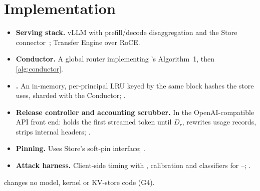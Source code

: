 \section{Implementation}
\label{sec:impl}

\begin{itemize}
\item \textbf{Serving stack.} vLLM  with prefill/decode
  disaggregation and the \mc Store connector~\cite{mooncakerepo}; \mc
  Transfer Engine over RoCE.
\item \textbf{Conductor.} A global router implementing \mc's Algorithm~1, then
  \cref{alg:conductor}. 
\item \textbf{\vcd.} An in-memory, per-principal LRU keyed by the same block
  hashes the store uses, sharded with the Conductor; .
\item \textbf{Release controller and accounting scrubber.} In the
  OpenAI-compatible API front end: holds the first streamed token until $D_r$,
  rewrites usage records, strips internal headers; .
\item \textbf{Pinning.} Uses \mc Store's soft-pin interface; .
\item \textbf{Attack harness.} Client-side timing with ,
  calibration and classifiers for --; .
\end{itemize}
\sys changes no model, kernel or KV-store code (G4).
